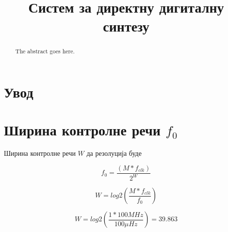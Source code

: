 \documentclass[conference]{IEEEJERM}
\begin{document}
%
\title{Систем за директну дигиталну синтезу}


\author{
}



\maketitle

\begin{abstract}
The abstract goes here.
\end{abstract}

\IEEEpeerreviewmaketitle



\section{Увод}

 


\section{Ширина контролне речи $f_0$}

Ширина контролне речи $W$ да резолуција буде %

\begin{equation}
f_0 = \dfrac{(M * f_{clk})}{2^W}
\end{equation}

\begin{equation}
W = log2\left(\dfrac{ M*f_{clk} }{ f_0}\right)
\end{equation}

\begin{equation}
W = log2\left(\dfrac{ 1 * 100 M Hz }{ 100 \mu Hz}\right) = 39.863 
\end{equation}
\end{document}
